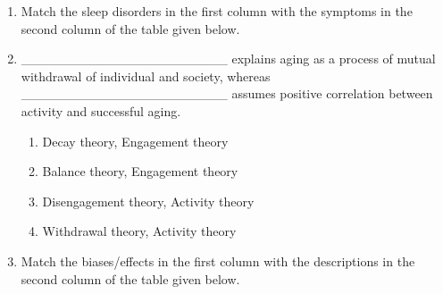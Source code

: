 \documentclass[12pt]{article}
\theoremstyle{remark}
\begin{document}
\begin{enumerate}
\begin{enumerate}
 \end{enumerate}
\hfill{}
\item Match the sleep disorders in the first column with the symptoms in the second column of the table given below.
\begin{table}[H]
    \centering
    
    \caption{}
    \label{tab:5.3}
\end{table}
\begin{enumerate}  \end{enumerate}
\hfill{}
\item \_\_\_\_\_\_\_\_\_\_\_\_\_\_\_\_\_\_\_\_\_\_ explains aging as a process of mutual withdrawal of individual and society, whereas \_\_\_\_\_\_\_\_\_\_\_\_\_\_\_\_\_\_\_\_\_\_ assumes positive correlation between activity and successful aging.
\begin{enumerate}
    \item Decay theory, Engagement theory
    \item Balance theory, Engagement theory
    \item Disengagement theory, Activity theory
    \item Withdrawal theory, Activity theory
\end{enumerate}
\hfill{}
\item Match the biases/effects in the first column with the descriptions in the second column of the table given below.
\begin{table}[H]
    \centering
    
    \caption{}
    \label{tab:5.4}
\end{table}
\begin{enumerate} 
\end{enumerate}
\end{enumerate}
\end{document}
